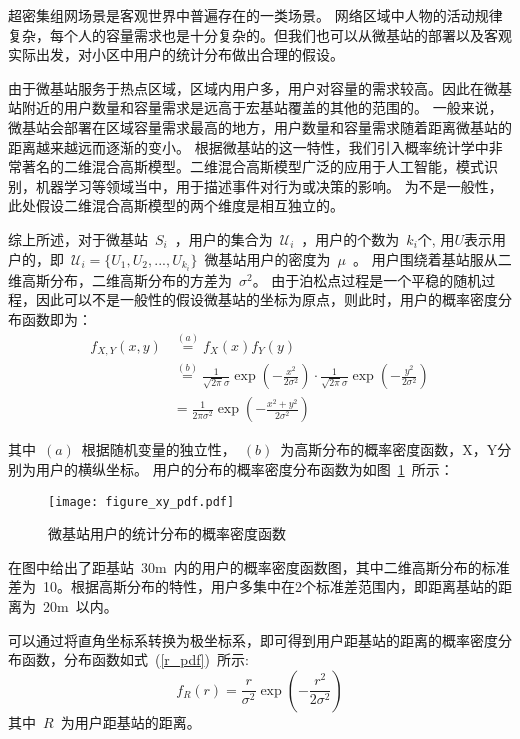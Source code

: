 
超密集组网场景是客观世界中普遍存在的一类场景。
网络区域中人物的活动规律复杂，每个人的容量需求也是十分复杂的。但我们也可以从微基站的部署以及客观实际出发，对小区中用户的统计分布做出合理的假设。

由于微基站服务于热点区域，区域内用户多，用户对容量的需求较高。因此在微基站附近的用户数量和容量需求是远高于宏基站覆盖的其他的范围的。
一般来说，微基站会部署在区域容量需求最高的地方，用户数量和容量需求随着距离微基站的距离越来越远而逐渐的变小。
根据微基站的这一特性，我们引入概率统计学中非常著名的二维混合高斯模型。二维混合高斯模型广泛的应用于人工智能，模式识别，机器学习等领域当中，用于描述事件对行为或决策的影响。
为不是一般性，此处假设二维混合高斯模型的两个维度是相互独立的。

综上所述，对于微基站~$S_i$~，用户的集合为~$\mathcal{U}_i$~，用户的个数为~$k_i$个, 用$U$表示用户的，即~$\mathcal{U}_i=\{U_1, U_2, ..., U_{k_i}\}$~微基站用户的密度为~$\mu$~。
用户围绕着基站服从二维高斯分布，二维高斯分布的方差为~$\sigma^2$。
由于泊松点过程是一个平稳的随机过程，因此可以不是一般性的假设微基站的坐标为原点，则此时，用户的概率密度分布函数即为：
\begin{equation}
  \begin{aligned}
  f_{X,Y}(x,y) &\overset{(a)}{=} f_X(x) f_Y(y) \\
               &\overset{(b)}{=} \frac{1}{\sqrt{2\pi}\sigma}\exp\left(-\frac{x^2}{2\sigma^2}\right)\cdot\frac{1}{\sqrt{2\pi}\sigma}\exp\left(-\frac{y^2}{2\sigma^2}\right) \\
               &=\frac{1}{2\pi\sigma^2}\exp\left(-\frac{x^2+y^2}{2\sigma^2}\right)
  \end{aligned}
\end{equation}

其中~$(a)$~根据随机变量的独立性，~$(b)$~为高斯分布的概率密度函数，X，Y分别为用户的横纵坐标。
用户的分布的概率密度分布函数为如图~\ref{figure_xy_pdf}~所示：
\begin{figure}[htbp]
\centering
\texttt{[image: figure\_xy\_pdf.pdf]}
\caption{微基站用户的统计分布的概率密度函数}\vspace{-0.5em}
\label{figure_xy_pdf}
\end{figure}

在图中给出了距基站~30m~内的用户的概率密度函数图，其中二维高斯分布的标准差为~10。根据高斯分布的特性，用户多集中在2个标准差范围内，即距离基站的距离为~20m~以内。

可以通过将直角坐标系转换为极坐标系，即可得到用户距基站的距离的概率密度分布函数，分布函数如式~(\ref{r_pdf})~所示:
\begin{equation}\label{r_pdf}
  f_R(r) = \frac{r}{\sigma^2}\exp(-\frac{r^2}{2\sigma^2})
\end{equation}
其中~$R$~为用户距基站的距离。

